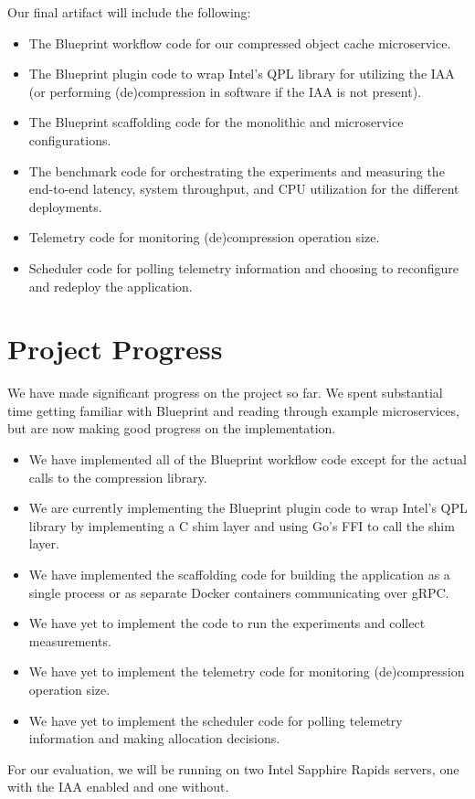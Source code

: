 \documentclass[letterpaper,twocolumn,10pt]{article}
\begin{document}
Our final artifact will include the following:
\begin{itemize}
    \item The Blueprint workflow code for our compressed object cache microservice.
    \item The Blueprint plugin code to wrap Intel's QPL library for utilizing the IAA (or performing (de)compression in software if the IAA is not present).
    \item The Blueprint scaffolding code for the monolithic and microservice configurations.
    \item The benchmark code for orchestrating the experiments and measuring the end-to-end latency, system throughput, and CPU utilization for the different deployments.
    \item Telemetry code for monitoring (de)compression operation size.
    \item Scheduler code for polling telemetry information and choosing to reconfigure and redeploy the application.
\end{itemize}

\section{Project Progress}

We have made significant progress on the project so far.
We spent substantial time getting familiar with Blueprint and reading through example microservices, but are now making good progress on the implementation.
\begin{itemize}
    \item We have implemented all of the Blueprint workflow code except for the actual calls to the compression library.
    \item We are currently implementing the Blueprint plugin code to wrap Intel's QPL library by implementing a C shim layer and using Go's FFI to call the shim layer.
    \item We have implemented the scaffolding code for building the application as a single process or as separate Docker containers communicating over gRPC.
    \item We have yet to implement the code to run the experiments and collect measurements.
    \item We have yet to implement the telemetry code for monitoring (de)compression operation size.
    \item We have yet to implement the scheduler code for polling telemetry information and making allocation decisions.
\end{itemize}
For our evaluation, we will be running on two Intel Sapphire Rapids servers, one with the IAA enabled and one without.



\end{document}
